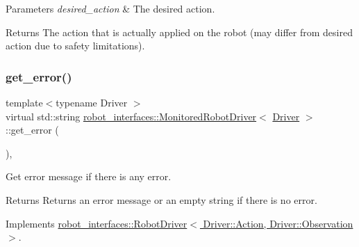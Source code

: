\begin{DoxyParams}{Parameters}
{\em desired\+\_\+action} & The desired action. \\
\hline
\end{DoxyParams}
\begin{DoxyReturn}{Returns}
The action that is actually applied on the robot (may differ from desired action due to safety limitations). 
\end{DoxyReturn}
\mbox{\label{classrobot__interfaces_1_1MonitoredRobotDriver_a944425cc7e0845184f33b16405a9e61e}} 
\subsubsection{\texorpdfstring{get\+\_\+error()}{get\_error()}}
{\footnotesize\ttfamily template$<$typename Driver $>$ \\
virtual std\+::string \hyperlink{classrobot__interfaces_1_1MonitoredRobotDriver}{robot\+\_\+interfaces\+::\+Monitored\+Robot\+Driver}$<$ \hyperlink{classDriver}{Driver} $>$\+::get\+\_\+error (\begin{DoxyParamCaption}{ }\end{DoxyParamCaption})\hspace{0.3cm}{\ttfamily [inline]}, {\ttfamily [virtual]}}



Get error message if there is any error. 

\begin{DoxyReturn}{Returns}
Returns an error message or an empty string if there is no error. 
\end{DoxyReturn}


Implements \hyperlink{classrobot__interfaces_1_1RobotDriver_acdf4c5d6993b836a180e6b6fc12b3445}{robot\+\_\+interfaces\+::\+Robot\+Driver$<$ Driver\+::\+Action, Driver\+::\+Observation $>$}.

\mbox{\label{classrobot__interfaces_1_1MonitoredRobotDriver_a97774dddcda1038f338d18ef0b572ad8}} 
